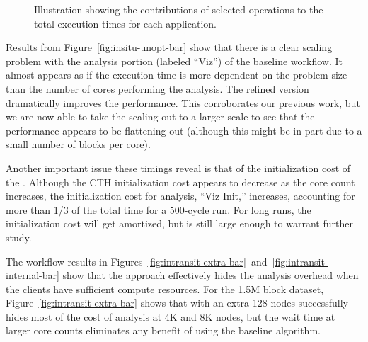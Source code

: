 \begin{figure}[htbp]
\begin{centering}
\vspace{-24pt}

\vspace{-24pt}

\vspace{-24pt}

\caption[Breakdown of operation timings.]{Illustration showing the
contributions of selected operations to the total execution times for each
application.}
\label{fig:runtime-individual-bar}
\end{centering}
\end{figure}


Results from Figure~\ref{fig:insitu-unopt-bar} show that there is a clear
scaling problem with the analysis portion (labeled ``Viz'') of the baseline
\insitu workflow.  It almost appears as if the execution time is more
dependent on the problem size than the number of cores performing the analysis.
The refined version dramatically improves the performance.  This
corroborates our previous work, but we are now able to
take the scaling out to a larger scale to see that the performance appears
to be flattening out (although this might be in part due to a small number
of blocks per core).

Another important issue these timings reveal is that of the initialization
cost of the \vda.  Although the CTH initialization cost appears to decrease
as the core count increases, the initialization cost for analysis, ``Viz
Init,'' increases, accounting for more than 1/3 of the total time for a
500-cycle run.  For long runs, the initialization cost will get amortized,
but is still large enough to warrant further study.

The \intransit workflow results in
Figures~\ref{fig:intransit-extra-bar}~and~\ref{fig:intransit-internal-bar}
show that the \intransit approach effectively hides the analysis overhead
when the clients have sufficient compute resources.  For the 1.5M block
dataset, Figure~\ref{fig:intransit-extra-bar} shows that \intransit with an
extra 128 nodes successfully hides most of the cost of analysis at 4K and 8K
nodes, but the wait time at larger core counts eliminates any benefit of
\intransit using the baseline algorithm.

